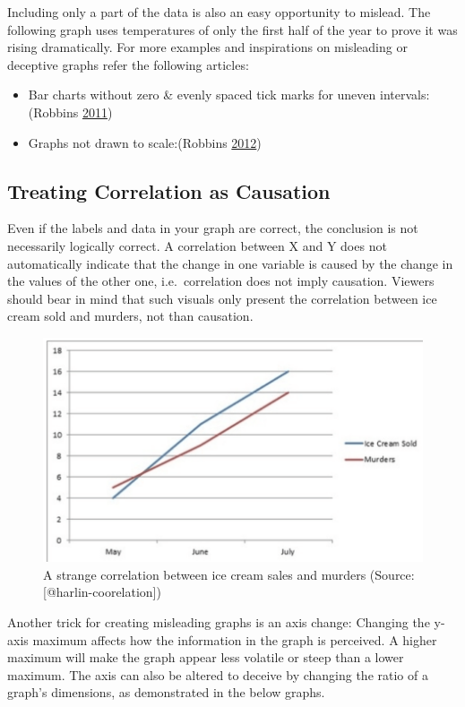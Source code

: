 \documentclass[]{book}
\providecommand{\tightlist}{%
  \setlength{\itemsep}{0pt}\setlength{\parskip}{0pt}}
\begin{document}
Including only a part of the data is also an easy opportunity to
mislead. The following graph uses temperatures of only the first half of
the year to prove it was rising dramatically. For more examples and
inspirations on misleading or deceptive graphs refer the following
articles:

\begin{itemize}
\tightlist
\item
  Bar charts without zero \& evenly spaced tick marks for uneven
  intervals: (Robbins \protect\hyperlink{ref-whats_wrong}{2011})
\item
  Graphs not drawn to scale:(Robbins
  \protect\hyperlink{ref-scaling_issues}{2012})
\end{itemize}

\subsection{Treating Correlation as
Causation}\label{treating-correlation-as-causation}

Even if the labels and data in your graph are correct, the conclusion is
not necessarily logically correct. A correlation between X and Y does
not automatically indicate that the change in one variable is caused by
the change in the values of the other one, i.e.~correlation does not
imply causation. Viewers should bear in mind that such visuals only
present the correlation between ice cream sold and murders, not than
causation.

\begin{figure}
\includegraphics[width=0.7\linewidth]{images/harlin-ice-cream} \caption{A strange correlation between ice cream sales and murders (Source: [@harlin-coorelation])}\label{fig:harlin-ice-cream}
\end{figure}

Another trick for creating misleading graphs is an axis change: Changing
the y-axis maximum affects how the information in the graph is
perceived. A higher maximum will make the graph appear less volatile or
steep than a lower maximum. The axis can also be altered to deceive by
changing the ratio of a graph's dimensions, as demonstrated in the below
graphs.
\end{document}
